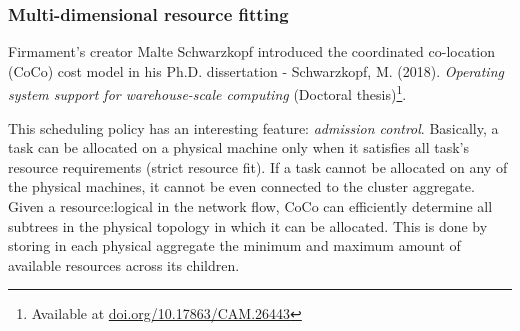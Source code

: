 \subsubsection{Multi-dimensional resource fitting} \label{firmament:multi-dimensions}
Firmament's \cite{firmament} creator Malte Schwarzkopf introduced the coordinated co-location (CoCo) cost model in his Ph.D. dissertation - Schwarzkopf, M. (2018). \textit{Operating system support for warehouse-scale computing} (Doctoral thesis)\footnote[2]{Available at \href{https://doi.org/10.17863/CAM.26443}{doi.org/10.17863/CAM.26443}}.\par
This scheduling policy has an interesting feature: \textit{admission control}.
Basically, a task can be allocated on a physical machine only when it satisfies all task's resource requirements (strict resource fit).
If a task cannot be allocated on any of the physical machines, it cannot be even connected to the cluster aggregate.
Given a \gls{resource:logical} in the network flow, CoCo can efficiently determine all subtrees in the physical topology in which it can be allocated.
This is done by storing in each physical aggregate the minimum and maximum amount of available resources across its children.